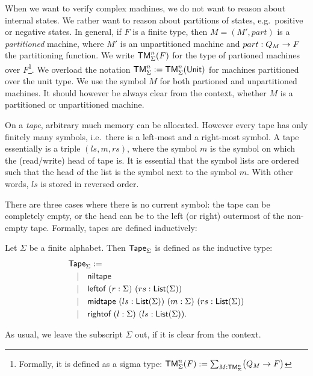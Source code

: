 When we want to verify complex machines, we do not want to reason about internal states.  We rather want to reason about partitions of states, e.g.\
positive or negative states.  In general, if $F$ is a finite type, then $M = (M', part)$ is a \emph{partitioned} machine, where $M'$ is an
unpartitioned machine and $part : Q_M \rightarrow F$ the partitioning function.  We write $\textsf{TM}_\Sigma^n(F)$ for the type of partioned machines over
$F$\footnote{Formally, it is defined as a sigma type: $\textsf{TM}_\Sigma^n(F) := \sum_{M:\textsf{TM}_\Sigma^n}\bigl(Q_M \rightarrow F\bigr)$}.  We overload the
notation $\textsf{TM}_\Sigma^n := \textsf{TM}_\Sigma^n(\textsf{Unit})$ for machines partitioned over the unit type.  We use the symbol $M$ for both partioned and
unpartitioned machines.  It should however be always clear from the context, whether $M$ is a partitioned or unpartitioned machine.

On a \emph{tape}, arbitrary much memory can be allocated.  However every tape has only finitely many symbols, i.e.\ there is a left-most and a
right-most symbol.  A tape essentially is a triple $(ls,m,rs)$, where the symbol $m$ is the symbol on which the (read/write) head of tape is.  It is
essential that the symbol lists are ordered such that the head of the list is the symbol next to the symbol $m$.  With other words, $ls$ is stored in
reversed order.

There are three cases where there is no current symbol: the tape can be completely empty, or the head can be to the left (or right) outermost of the
non-empty tape.  Formally, tapes are defined inductively:

\begin{definition}[Tape]
  \label{def:tape}
  Let $\Sigma$ be a finite alphabet.  Then $\textsf{Tape}_\Sigma$ is defined as the inductive type:
  \begin{align*}
    & \textsf{Tape}_\Sigma := \\
    & \quad | \quad \textsf{niltape} \\
    & \quad | \quad \textsf{leftof}  ~ (r:\Sigma) ~ (rs:\textsf{List}(\Sigma)) \\
    & \quad | \quad \textsf{midtape} ~ (ls:\textsf{List}(\Sigma)) ~ (m:\Sigma) ~ (rs:\textsf{List}(\Sigma)) \\
    & \quad | \quad \textsf{rightof} ~ (l:\Sigma) ~ (ls:\textsf{List}(\Sigma)).
  \end{align*}
\end{definition}

As usual, we leave the subscript $\Sigma$ out, if it is clear from the context.

